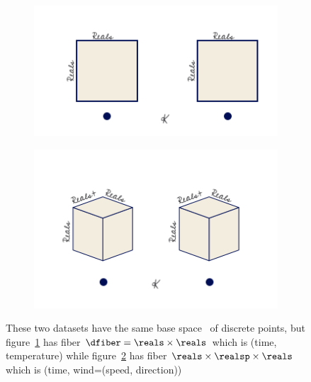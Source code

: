 \documentclass[../main.tex]{subfiles}
\begin{document}
\begin{figure}[H]
    \begin{subfigure}{.5\textwidth}
        \includegraphics[width=\textwidth]{figures/math/temp_1k.png}
        \caption{}
        \label{fig:fiber_example_plane}
    \end{subfigure}
    \begin{subfigure}{.5\textwidth}
        \includegraphics[width=\textwidth]{figures/math/temp_3f.png}
        \caption{}
        \label{fig:fiber_example_cube}
    \end{subfigure}
    \caption{These two datasets have the same base space \dbase\ of discrete points, but figure~\ref{fig:fiber_example_plane} has fiber  $\dfiber=\reals\times\reals$ which is (time, temperature) while figure~\ref{fig:fiber_example_cube} has fiber $\reals\times\realsp\times\reals$ which is (time, wind=(speed, direction))}
    \label{fig:data_fiber_example}
\end{figure}
\end{document}
